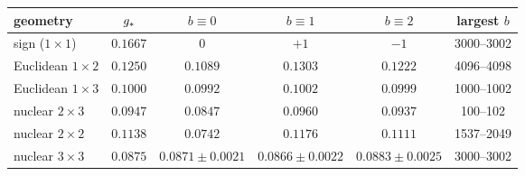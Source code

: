 \begin{tabular}{@{}lccccc@{}}
\toprule
geometry & $g_\ast$ & $b\equiv0$ & $b\equiv1$ & $b\equiv2$ & largest $b$\\
\midrule
sign ($1\times1$) & $0.1667$ & $0$ & $+1$ & $-1$ & 3000--3002\\
Euclidean $1\times2$ & $0.1250$ & $0.1089$ & $0.1303$ & $0.1222$ & 4096--4098\\
Euclidean $1\times3$ & $0.1000$ & $0.0992$ & $0.1002$ & $0.0999$ & 1000--1002\\
nuclear $2\times3$ & $0.0947$ & $0.0847$ & $0.0960$ & $0.0937$ & 100--102\\
nuclear $2\times2$ & $0.1138$ & $0.0742$ & $0.1176$ & $0.1111$ & 1537--2049\\
nuclear $3\times3$ & $0.0875$ & $0.0871\pm0.0021$ & $0.0866\pm0.0022$ & $0.0883\pm0.0025$ & 3000--3002\\
\bottomrule
\end{tabular}
